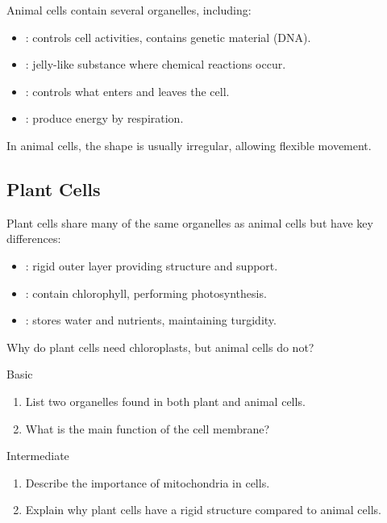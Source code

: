 Animal cells contain several organelles, including:

\begin{itemize}
    \item {}: controls cell activities, contains genetic material (DNA).
    \item {}: jelly-like substance where chemical reactions occur.
    \item {}: controls what enters and leaves the cell.
    \item {}: produce energy by respiration.
\end{itemize}

In animal cells, the shape is usually irregular, allowing flexible movement.

\subsection{Plant Cells}

Plant cells share many of the same organelles as animal cells but have key differences:

\begin{itemize}
    \item {}: rigid outer layer providing structure and support.
    \item {}: contain chlorophyll, performing photosynthesis.
    \item {}: stores water and nutrients, maintaining turgidity.
\end{itemize}

\begin{stopandthink}
Why do plant cells need chloroplasts, but animal cells do not?
\end{stopandthink}

\begin{tieredquestions}{Basic}
\begin{enumerate}
    \item List two organelles found in both plant and animal cells.
    \item What is the main function of the cell membrane?
\end{enumerate}
\end{tieredquestions}

\begin{tieredquestions}{Intermediate}
\begin{enumerate}
    \item Describe the importance of mitochondria in cells.
    \item Explain why plant cells have a rigid structure compared to animal cells.
\end{enumerate}
\end{tieredquestions}

